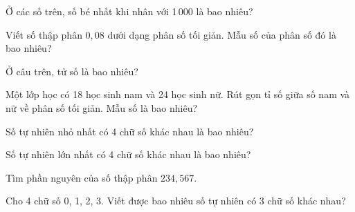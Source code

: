 \begin{ex}
  Ở các số trên, số bé nhất khi nhân với 1\,000 là bao nhiêu?
\end{ex}

\begin{ex}
  Viết số thập phân $0{,}08$ dưới dạng phân số tối giản. Mẫu số của phân số đó là bao nhiêu?
\end{ex}

\begin{ex}
  Ở câu trên, tử số là bao nhiêu?
\end{ex}

\begin{ex}
  Một lớp học có 18 học sinh nam và 24 học sinh nữ. Rút gọn tỉ số giữa số nam và nữ về phân số tối giản. Mẫu số là bao nhiêu?
\end{ex}

\begin{ex}
  Số tự nhiên nhỏ nhất có 4 chữ số khác nhau là bao nhiêu?
\end{ex}

\begin{ex}
  Số tự nhiên lớn nhất có 4 chữ số khác nhau là bao nhiêu?
\end{ex}

\begin{ex}
  Tìm phần nguyên của số thập phân $234{,}567$.
\end{ex}

\begin{ex}
  Cho 4 chữ số 0, 1, 2, 3. Viết được bao nhiêu số tự nhiên có 3 chữ số khác nhau?
\end{ex}

